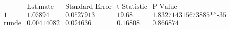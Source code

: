\[\begin{array}{l|llll}
 \text{} & \text{Estimate} & \text{Standard Error} & \text{t-Statistic} & \text{P-Value} \\
\hline
 1 & 1.03894 & 0.0527913 & 19.68 & \text{1.832714315673885$\grave{ }$*${}^{\wedge}$-35} \\
 \text{runde} & 0.00414082 & 0.024636 & 0.16808 & 0.866874 \\
\end{array}\]

